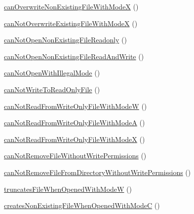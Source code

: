 \begin{DoxyCompactItemize}
\mbox{\hyperlink{classorg_1_1bovigo_1_1vfs_1_1vfs_stream_wrapper_file_test_case_a10254b8d8c0e4158073c0c29a9aab591}{can\+Overwrite\+Non\+Existing\+File\+With\+ModeX}} ()
\item 
\mbox{\hyperlink{classorg_1_1bovigo_1_1vfs_1_1vfs_stream_wrapper_file_test_case_ad3a9e9c8b23d71e664bfd46f9db8a287}{can\+Not\+Overwrite\+Existing\+File\+With\+ModeX}} ()
\item 
\mbox{\hyperlink{classorg_1_1bovigo_1_1vfs_1_1vfs_stream_wrapper_file_test_case_ae797120ddaa5e8e0f7201c8d4b3c3a84}{can\+Not\+Open\+Non\+Existing\+File\+Readonly}} ()
\item 
\mbox{\hyperlink{classorg_1_1bovigo_1_1vfs_1_1vfs_stream_wrapper_file_test_case_ac94c05744d2d2db1241a1810e7a7115e}{can\+Not\+Open\+Non\+Existing\+File\+Read\+And\+Write}} ()
\item 
\mbox{\hyperlink{classorg_1_1bovigo_1_1vfs_1_1vfs_stream_wrapper_file_test_case_aa8d12f93e966933647b82851f90c07a7}{can\+Not\+Open\+With\+Illegal\+Mode}} ()
\item 
\mbox{\hyperlink{classorg_1_1bovigo_1_1vfs_1_1vfs_stream_wrapper_file_test_case_a65d8f0bc4446a61da1fb3feaf39549ba}{can\+Not\+Write\+To\+Read\+Only\+File}} ()
\item 
\mbox{\hyperlink{classorg_1_1bovigo_1_1vfs_1_1vfs_stream_wrapper_file_test_case_a71466527770d6a354b9d68f0c34d0a5b}{can\+Not\+Read\+From\+Write\+Only\+File\+With\+ModeW}} ()
\item 
\mbox{\hyperlink{classorg_1_1bovigo_1_1vfs_1_1vfs_stream_wrapper_file_test_case_a4f402544a4fa324e56c8eef174e1e4f2}{can\+Not\+Read\+From\+Write\+Only\+File\+With\+ModeA}} ()
\item 
\mbox{\hyperlink{classorg_1_1bovigo_1_1vfs_1_1vfs_stream_wrapper_file_test_case_ad956366758fd42a905889ccb47e1d5b2}{can\+Not\+Read\+From\+Write\+Only\+File\+With\+ModeX}} ()
\item 
\mbox{\hyperlink{classorg_1_1bovigo_1_1vfs_1_1vfs_stream_wrapper_file_test_case_a4577ec30c5486539ac8061aea08c4af5}{can\+Not\+Remove\+File\+Without\+Write\+Permissions}} ()
\item 
\mbox{\hyperlink{classorg_1_1bovigo_1_1vfs_1_1vfs_stream_wrapper_file_test_case_a9388ebbd450025a9fe11f3b8256886c4}{can\+Not\+Remove\+File\+From\+Directory\+Without\+Write\+Permissions}} ()
\item 
\mbox{\hyperlink{classorg_1_1bovigo_1_1vfs_1_1vfs_stream_wrapper_file_test_case_a791b210404e2dd157bafdec2d96170cd}{truncates\+File\+When\+Opened\+With\+ModeW}} ()
\item 
\mbox{\hyperlink{classorg_1_1bovigo_1_1vfs_1_1vfs_stream_wrapper_file_test_case_ab39781c6cfbb94fc23f5ddb736d5154b}{creates\+Non\+Existing\+File\+When\+Opened\+With\+ModeC}} ()

\end{DoxyCompactItemize}
